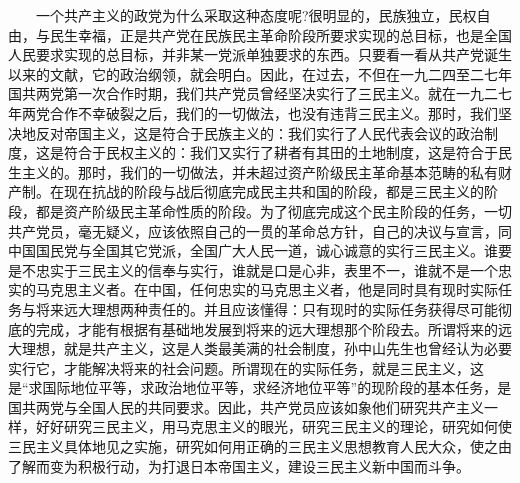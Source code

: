 \documentclass[cn,11pt,chinese]{elegantbook}
\begin{document}
　　一个共产主义的政党为什么采取这种态度呢?很明显的，民族独立，民权自由，与民生幸福，正是共产党在民族民主革命阶段所要求实现的总目标，也是全国人民要求实现的总目标，并非某一党派单独要求的东西。只要看一看从共产党诞生以来的文献，它的政治纲领，就会明白。因此，在过去，不但在一九二四至二七年国共两党第一次合作时期，我们共产党员曾经坚决实行了三民主义。就在一九二七年两党合作不幸破裂之后，我们的一切做法，也没有违背三民主义。那时，我们坚决地反对帝国主义，这是符合于民族主义的：我们实行了人民代表会议的政治制度，这是符合于民权主义的：我们又实行了耕者有其田的土地制度，这是符合于民生主义的。那时，我们的一切做法，并未超过资产阶级民主革命基本范畴的私有财产制。在现在抗战的阶段与战后彻底完成民主共和国的阶段，都是三民主义的阶段，都是资产阶级民主革命性质的阶段。为了彻底完成这个民主阶段的任务，一切共产党员，毫无疑义，应该依照自己的一贯的革命总方针，自己的决议与宣言，同中国国民党与全国其它党派，全国广大人民一道，诚心诚意的实行三民主义。谁要是不忠实于三民主义的信奉与实行，谁就是口是心非，表里不一，谁就不是一个忠实的马克思主义者。在中国，任何忠实的马克思主义者，他是同时具有现时实际任务与将来远大理想两种责任的。并且应该懂得：只有现时的实际任务获得尽可能彻底的完成，才能有根据有基础地发展到将来的远大理想那个阶段去。所谓将来的远大理想，就是共产主义，这是人类最美满的社会制度，孙中山先生也曾经认为必要实行它，才能解决将来的社会问题。所谓现在的实际任务，就是三民主义，这是“求国际地位平等，求政治地位平等，求经济地位平等”的现阶段的基本任务，是国共两党与全国人民的共同要求。因此，共产党员应该如象他们研究共产主义一样，好好研究三民主义，用马克思主义的眼光，研究三民主义的理论，研究如何使三民主义具体地见之实施，研究如何用正确的三民主义思想教育人民大众，使之由了解而变为积极行动，为打退日本帝国主义，建设三民主义新中国而斗争。\\
\end{document}
